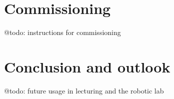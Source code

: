 \documentclass[12pt]{article}
\begin{document}
\section{Commissioning}

@todo: instructions for commissioning

\section{Conclusion and outlook}

@todo: future usage in lecturing and the robotic lab
\end{document}

